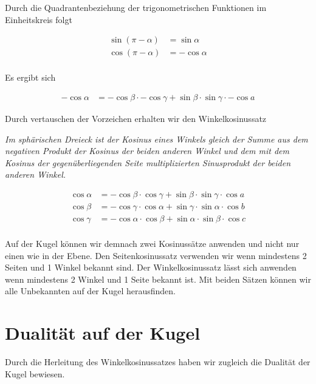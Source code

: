 \begin{refsection}
Durch die Quadrantenbeziehung der trigonometrischen Funktionen im Einheitskreis folgt

\begin{align*}
\sin (\pi-\alpha) &= \sin \alpha\\
\cos (\pi-\alpha) &= - \cos \alpha\\
\end{align*}

Es ergibt sich

\begin{align*}
{-\cos \alpha} &= {-\cos \beta} \cdot {-\cos \gamma} + {\sin \beta} \cdot {\sin \gamma} \cdot {-\cos a}
\end{align*}

Durch vertauschen der Vorzeichen erhalten wir den Winkelkosinussatz

\begin{satz}\textit{Im sphärischen Dreieck ist der Kosinus eines Winkels gleich der Summe aus dem negativen Produkt der Kosinus der beiden anderen Winkel und dem mit dem Kosinus der gegenüberliegenden Seite multiplizierten Sinusprodukt der beiden anderen Winkel.}
\label{skript:kugel:satz:Winkelkosinussatz}
\end{satz}

\begin{align*}
{\cos \alpha} &= {-\cos \beta} \cdot {\cos \gamma} + {\sin \beta} \cdot {\sin \gamma} \cdot {\cos a}\\
{\cos \beta} &= {-\cos \gamma} \cdot {\cos \alpha} + {\sin \gamma} \cdot {\sin \alpha} \cdot {\cos b}\\
{\cos \gamma} &= {-\cos \alpha} \cdot {\cos \beta} + {\sin \alpha} \cdot {\sin \beta} \cdot {\cos c}\\
\end{align*}

Auf der Kugel können wir demnach zwei Kosinussätze anwenden und nicht nur einen wie in der Ebene. Den Seitenkosinussatz verwenden wir wenn mindestens 2 Seiten und 1 Winkel bekannt sind. Der Winkelkosinussatz lässt sich anwenden wenn mindestens 2 Winkel und 1 Seite bekannt ist. Mit beiden Sätzen können wir alle Unbekannten auf der Kugel herausfinden.



\section{Dualität auf der Kugel}

Durch die Herleitung des Winkelkosinussatzes haben wir zugleich die Dualität der Kugel bewiesen.


\end{refsection}
